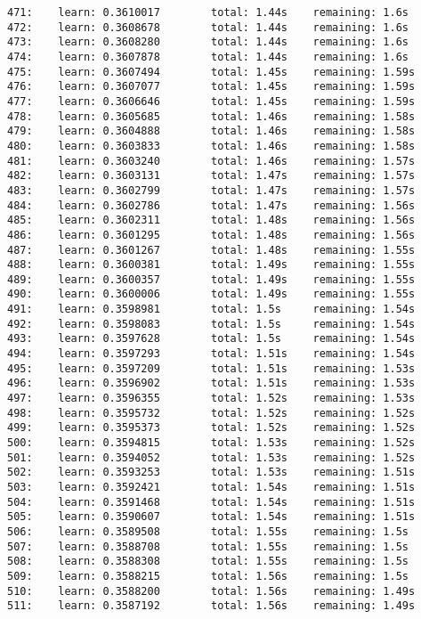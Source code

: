 \documentclass[11pt]{article}
\begin{document}
\begin{Verbatim}[commandchars=\\\{\}]
471:    learn: 0.3610017        total: 1.44s    remaining: 1.6s
472:    learn: 0.3608678        total: 1.44s    remaining: 1.6s
473:    learn: 0.3608280        total: 1.44s    remaining: 1.6s
474:    learn: 0.3607878        total: 1.44s    remaining: 1.6s
475:    learn: 0.3607494        total: 1.45s    remaining: 1.59s
476:    learn: 0.3607077        total: 1.45s    remaining: 1.59s
477:    learn: 0.3606646        total: 1.45s    remaining: 1.59s
478:    learn: 0.3605685        total: 1.46s    remaining: 1.58s
479:    learn: 0.3604888        total: 1.46s    remaining: 1.58s
480:    learn: 0.3603833        total: 1.46s    remaining: 1.58s
481:    learn: 0.3603240        total: 1.46s    remaining: 1.57s
482:    learn: 0.3603131        total: 1.47s    remaining: 1.57s
483:    learn: 0.3602799        total: 1.47s    remaining: 1.57s
484:    learn: 0.3602786        total: 1.47s    remaining: 1.56s
485:    learn: 0.3602311        total: 1.48s    remaining: 1.56s
486:    learn: 0.3601295        total: 1.48s    remaining: 1.56s
487:    learn: 0.3601267        total: 1.48s    remaining: 1.55s
488:    learn: 0.3600381        total: 1.49s    remaining: 1.55s
489:    learn: 0.3600357        total: 1.49s    remaining: 1.55s
490:    learn: 0.3600006        total: 1.49s    remaining: 1.55s
491:    learn: 0.3598981        total: 1.5s     remaining: 1.54s
492:    learn: 0.3598083        total: 1.5s     remaining: 1.54s
493:    learn: 0.3597628        total: 1.5s     remaining: 1.54s
494:    learn: 0.3597293        total: 1.51s    remaining: 1.54s
495:    learn: 0.3597209        total: 1.51s    remaining: 1.53s
496:    learn: 0.3596902        total: 1.51s    remaining: 1.53s
497:    learn: 0.3596355        total: 1.52s    remaining: 1.53s
498:    learn: 0.3595732        total: 1.52s    remaining: 1.52s
499:    learn: 0.3595373        total: 1.52s    remaining: 1.52s
500:    learn: 0.3594815        total: 1.53s    remaining: 1.52s
501:    learn: 0.3594052        total: 1.53s    remaining: 1.52s
502:    learn: 0.3593253        total: 1.53s    remaining: 1.51s
503:    learn: 0.3592421        total: 1.54s    remaining: 1.51s
504:    learn: 0.3591468        total: 1.54s    remaining: 1.51s
505:    learn: 0.3590607        total: 1.54s    remaining: 1.51s
506:    learn: 0.3589508        total: 1.55s    remaining: 1.5s
507:    learn: 0.3588708        total: 1.55s    remaining: 1.5s
508:    learn: 0.3588308        total: 1.55s    remaining: 1.5s
509:    learn: 0.3588215        total: 1.56s    remaining: 1.5s
510:    learn: 0.3588200        total: 1.56s    remaining: 1.49s
511:    learn: 0.3587192        total: 1.56s    remaining: 1.49s

\end{Verbatim}
\end{document}
